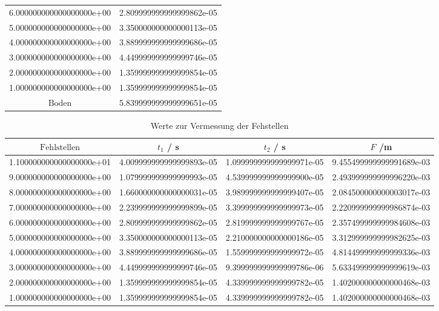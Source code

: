 \begin{table}
{\begin{tabular}{S[scientific-notation= fixed, fixed-exponent = 0, round-precision = 0] S}
    6.000000000000000000e+00 & 2.809999999999999862e-05\\
    5.000000000000000000e+00 & 3.350000000000000113e-05\\
    4.000000000000000000e+00 & 3.889999999999999686e-05\\
    3.000000000000000000e+00 & 4.449999999999999746e-05\\
    2.000000000000000000e+00 & 1.359999999999999854e-05\\
    1.000000000000000000e+00 & 1.359999999999999854e-05\\
    $\text{Boden}$ & 5.839999999999999651e-05\\
    \bottomrule
  \end{tabular}
  \label{tab:ABB}
}
\end{table}
\begin{table}
  \centering
  \caption{Werte zur Vermessung der Fehstellen}
  \begin{tabular}{S[scientific-notation = fixed , fixed-exponent = 0, round-precision=0] S S S}
    \toprule
    $ \text{Fehlstellen} $& $ t_{1} $ / \si{\second}&  $ t_{2} $ / \si{\second} & $F$ /\si{\meter} \\
    \midrule
    1.100000000000000000e+01 & 4.009999999999999893e-05 & 1.099999999999999971e-05 & 9.455499999999991689e-03\\
    9.000000000000000000e+00 & 1.079999999999999993e-05 & 4.539999999999999900e-05 & 2.493999999999996220e-03\\
    8.000000000000000000e+00 & 1.660000000000000031e-05 & 3.989999999999999407e-05 & 2.084500000000003017e-03\\
    7.000000000000000000e+00 & 2.239999999999999899e-05 & 3.399999999999999973e-05 & 2.220999999999986874e-03\\
    6.000000000000000000e+00 & 2.809999999999999862e-05 & 2.819999999999999767e-05 & 2.357499999999984608e-03\\
    5.000000000000000000e+00 & 3.350000000000000113e-05 & 2.210000000000000186e-05 & 3.312999999999982625e-03\\
    4.000000000000000000e+00 & 3.889999999999999686e-05 & 1.559999999999999972e-05 & 4.814499999999999336e-03\\
    3.000000000000000000e+00 & 4.449999999999999746e-05 & 9.399999999999999786e-06 & 5.633499999999999619e-03\\
    2.000000000000000000e+00 & 1.359999999999999854e-05 & 4.339999999999999782e-05 & 1.402000000000000468e-03\\
    1.000000000000000000e+00 & 1.359999999999999854e-05 & 4.339999999999999782e-05 & 1.402000000000000468e-03\\
    \bottomrule
  \end{tabular}
  \label{tab:F1}
\end{table}
